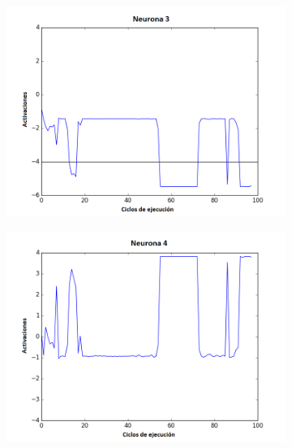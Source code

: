 \begin{figure}[!h]
\begin{subfigure}{0.33\textwidth}
  \includegraphics[width=\linewidth]{Imagenes/Agente1Activaciones/Agente1/Neurona2}
\end{subfigure}
\medskip
\begin{subfigure}{0.33\textwidth}
  \includegraphics[width=\linewidth]{Imagenes/Agente1Activaciones/Agente1/Neurona3}
\end{subfigure}\hfil %
\begin{subfigure}{0.33\textwidth}

\end{subfigure}
\end{figure}
